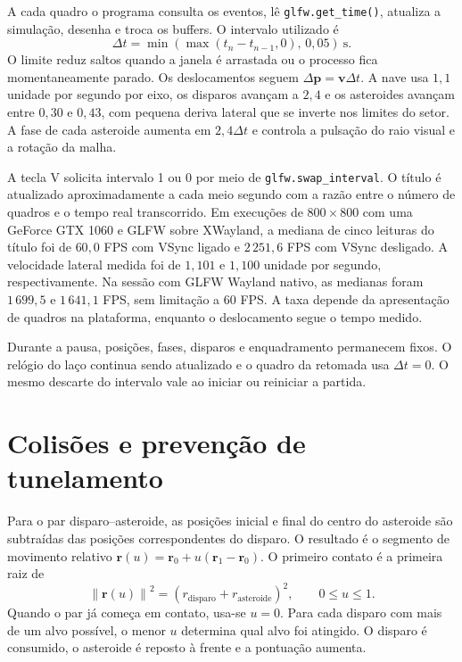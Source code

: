 \documentclass[12pt,a4paper]{article}
\begin{document}
A cada quadro o programa consulta os eventos, lê \texttt{glfw.get\_time()}, atualiza a simulação, desenha e troca os buffers. O intervalo utilizado é
\begin{equation}
  \Delta t = \min\!\left(\max(t_n-t_{n-1},0),\,0{,}05\right)\ \mathrm{s}.
\end{equation}
O limite reduz saltos quando a janela é arrastada ou o processo fica momentaneamente parado. Os deslocamentos seguem $\Delta\mathbf{p}=\mathbf{v}\Delta t$. A nave usa $1{,}1$ unidade por segundo por eixo, os disparos avançam a $2{,}4$ e os asteroides avançam entre $0{,}30$ e $0{,}43$, com pequena deriva lateral que se inverte nos limites do setor. A fase de cada asteroide aumenta em $2{,}4\Delta t$ e controla a pulsação do raio visual e a rotação da malha.

A tecla V solicita intervalo 1 ou 0 por meio de \texttt{glfw.swap\_interval}. O título é atualizado aproximadamente a cada meio segundo com a razão entre o número de quadros e o tempo real transcorrido.
Em execuções de $800\times800$ com uma GeForce GTX 1060 e GLFW sobre XWayland, a mediana de cinco leituras do título foi de $60{,}0$ FPS com VSync ligado e $2\,251{,}6$ FPS com VSync desligado. A velocidade lateral medida foi de $1{,}101$ e $1{,}100$ unidade por segundo, respectivamente. Na sessão com GLFW Wayland nativo, as medianas foram $1\,699{,}5$ e $1\,641{,}1$ FPS, sem limitação a $60$ FPS. A taxa depende da apresentação de quadros na plataforma, enquanto o deslocamento segue o tempo medido.

Durante a pausa, posições, fases, disparos e enquadramento permanecem fixos. O relógio do laço continua sendo atualizado e o quadro da retomada usa $\Delta t=0$. O mesmo descarte do intervalo vale ao iniciar ou reiniciar a partida.

\section{Colisões e prevenção de tunelamento}

Para o par disparo--asteroide, as posições inicial e final do centro do asteroide são subtraídas das posições correspondentes do disparo. O resultado é o segmento de movimento relativo $\mathbf{r}(u)=\mathbf{r}_0+u(\mathbf{r}_1-\mathbf{r}_0)$. O primeiro contato é a primeira raiz de
\begin{equation}
  \left\|\mathbf{r}(u)\right\|^2
  = \left(r_{\mathrm{disparo}} + r_{\mathrm{asteroide}}\right)^2,
  \qquad 0\leq u\leq 1.
\end{equation}
Quando o par já começa em contato, usa-se $u=0$. Para cada disparo com mais de um alvo possível, o menor $u$ determina qual alvo foi atingido. O disparo é consumido, o asteroide é reposto à frente e a pontuação aumenta.
\end{document}

